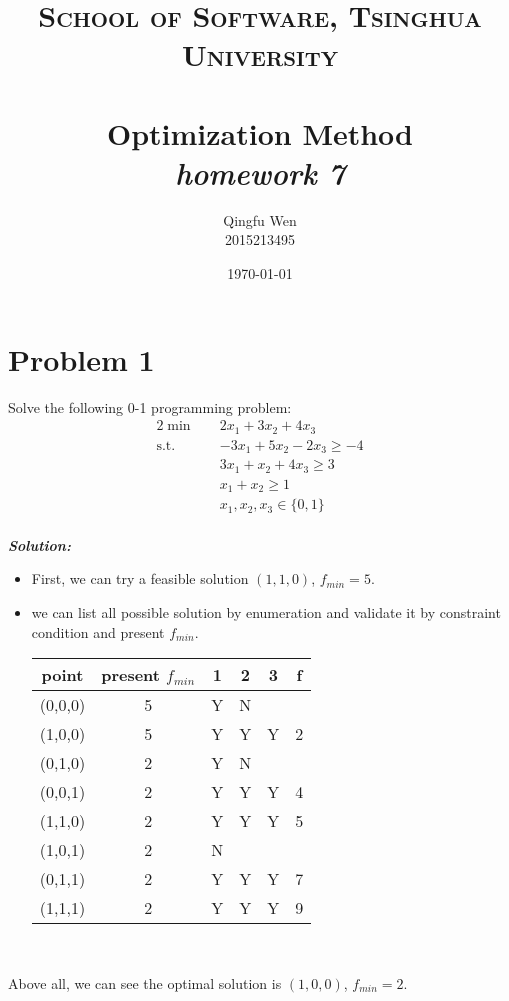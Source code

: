 \documentclass[paper=a4, fontsize=11pt]{scrartcl} %
\title{	
\normalfont \normalsize
\textsc{School of Software, Tsinghua University} \\ [25pt] %
\horrule{0.5pt} \\[0.4cm] %
\huge Optimization Method\\ %
\LARGE\textit{homework 7}
\horrule{2pt} \\[0.5cm] %
}
\author{Qingfu Wen \\ \normalsize 2015213495} %
\date{\normalsize\today} %
\numberwithin{equation}{section} %
\numberwithin{figure}{section} %
\numberwithin{table}{section} %
\begin{document}
\maketitle %
\tableofcontents
\newpage
\section{Problem 1}
Solve the following 0-1 programming problem:
\begin{alignat}{2}          \nonumber
\min\quad & 2x_1+3x_2+4x_3 \\    \nonumber
\mbox{s.t.}\quad            \nonumber
& -3x_1+5x_2-2x_3 \geq -4\\
& 3x_1+x_2+4x_3 \geq 3\\
& x_1+x_2 \geq 1\\
& x_1,x_2,x_3\in \{0,1\}
\end{alignat}\\
\emph{\textbf{Solution:}}
\begin{itemize}
\item First, we can try a feasible solution $(1,1,0)$, $f_{min} = 5$.
\item we can list all possible solution by enumeration and validate it by constraint condition and present $f_{min}$.\\
\begin{tabular}{|c|c|c|c|c|c|}
\hline point&present $f_{min}$&1&2&3&f\\
\hline(0,0,0)&5&Y&N&&\\
\hline(1,0,0)&5&Y&Y&Y&2\\
\hline(0,1,0)&2&Y&N&&\\
\hline(0,0,1)&2&Y&Y&Y&4\\
\hline(1,1,0)&2&Y&Y&Y&5\\
\hline(1,0,1)&2&N&&&\\
\hline(0,1,1)&2&Y&Y&Y&7\\
\hline(1,1,1)&2&Y&Y&Y&9\\
\hline
\end{tabular}\\
\end{itemize}
Above all, we can see the optimal solution is $(1,0,0)$, $f_{min}=2$.
\end{document}
